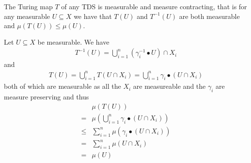 \begin{Lemma} \label{tds:lemma_tx_measurable:lemma}
	The Turing map $T$ of any TDS is measurable and measure contracting, that is for any measurable $U \subseteq X$ we have that $T(U)$ and $T^{-1}(U)$ are both measurable and $\mu(T(U)) \leq \mu(U)$.
\end{Lemma}
\proof
Let $U \subseteq X$ be measurable. We have
\begin{align*}
	T^{-1}(U) = \bigcup_{i=1}^n (\gamma_i^{-1} \bullet U) \cap X_i
\end{align*}
and
\begin{align*}
	T(U) = \bigcup_{i=1}^n T(U \cap X_i) = \bigcup_{i=1}^n \gamma_i \bullet (U \cap X_i)
\end{align*}
both of which are measurable as all the $X_i$ are measureable and the $\gamma_i$ are measure preserving and thus
\begin{align*}
	&\mu(T(U)) \\
	= &\mu(\bigcup_{i=1}^n \gamma_i \bullet (U \cap X_i)) \\
	\leq &\sum_{i=1}^n \mu(\gamma_i \bullet (U \cap X_i)) \\
	= &\sum_{i=1}^n \mu(U \cap X_i) \\
	= &\mu(U)
\end{align*}
\endproof
